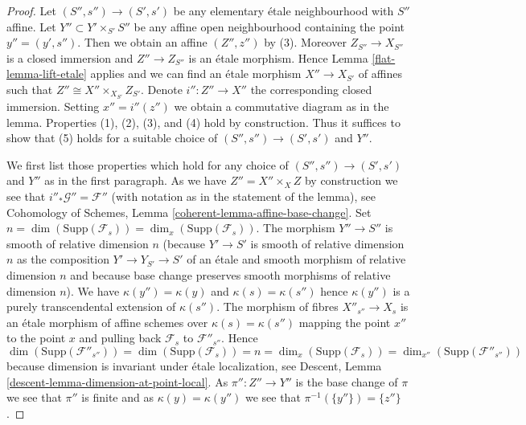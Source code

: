 \begin{proof}

Let $(S'', s'') \to (S', s')$ be any elementary \'etale neighbourhood
with $S''$ affine. Let $Y'' \subset Y' \times_{S'} S''$ be any affine
open neighbourhood containing the point $y'' = (y', s'')$. Then we
obtain an affine $(Z'', z'')$ by (3). Moreover $Z_{S''} \to X_{S''}$
is a closed immersion and $Z'' \to Z_{S''}$ is an \'etale
morphism. Hence
Lemma \ref{flat-lemma-lift-etale}
applies and we can find an \'etale morphism $X'' \to X_{S'}$ of affines
such that $Z'' \cong X'' \times_{X_{S'}} Z_{S'}$. Denote $i'' : Z'' \to X''$
the corresponding closed immersion. Setting $x'' = i''(z'')$ we obtain a
commutative diagram as in the lemma.
Properties (1), (2), (3), and (4) hold by construction.
Thus it suffices to show that (5) holds for a suitable choice of
$(S'', s'') \to (S', s')$ and $Y''$.

\medskip\noindent
We first list those properties which hold for any choice of
$(S'', s'') \to (S', s')$ and $Y''$ as in the first paragraph.
As we have $Z'' = X'' \times_X Z$ by construction we see that
$i''_*\mathcal{G}'' = \mathcal{F}''$ (with notation as in the
statement of the lemma), see
Cohomology of Schemes, Lemma \ref{coherent-lemma-affine-base-change}.
Set $n = \dim(\text{Supp}(\mathcal{F}_s)) = \dim_x(\text{Supp}(\mathcal{F}_s))$.
The morphism $Y'' \to S''$ is smooth of relative dimension $n$
(because $Y' \to S'$ is smooth of relative dimension $n$
as the composition $Y' \to Y_{S'} \to S'$ of an \'etale and
smooth morphism of relative dimension $n$ and because base change
preserves smooth morphisms of relative dimension $n$).
We have $\kappa(y'') = \kappa(y)$ and $\kappa(s) = \kappa(s'')$
hence $\kappa(y'')$ is a purely transcendental extension of $\kappa(s'')$.
The morphism of fibres $X''_{s''} \to X_s$ is an \'etale morphism of affine
schemes over $\kappa(s) = \kappa(s'')$ mapping the point $x''$ to the
point $x$ and pulling back $\mathcal{F}_s$ to $\mathcal{F}''_{s''}$.
Hence
$$
\dim(\text{Supp}(\mathcal{F}''_{s''})) =
\dim(\text{Supp}(\mathcal{F}_s)) = n =
\dim_x(\text{Supp}(\mathcal{F}_s)) =
\dim_{x''}(\text{Supp}(\mathcal{F}''_{s''}))
$$
because dimension is invariant under \'etale localization, see
Descent, Lemma \ref{descent-lemma-dimension-at-point-local}.
As $\pi'' : Z'' \to Y''$ is the base change of $\pi$ we see that
$\pi''$ is finite and as $\kappa(y) = \kappa(y'')$ we see that
$\pi^{-1}(\{y''\}) = \{z''\}$.


\end{proof}
